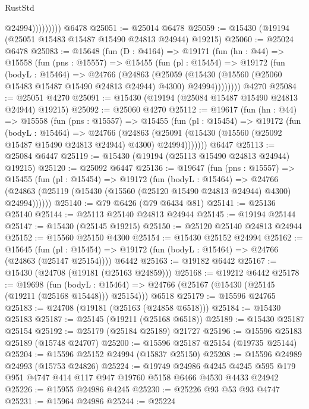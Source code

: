 \begin{lexlean}{RustStd}
\begin{coremodule}
                      @24994)))))))))
    @6478
@25051 := @25014 @6478
@25059 := @15430 (@19194 (@25051 @15483 @15487 @15490 @24813 @24944) @19215)
@25060 := @25024 @6478
@25083 := @15648
    (fun (D : @4164) =>
    @19171
      (fun (hn : @44) =>
      @15558
        (fun (pns : @15557) =>
        @15455
          (fun (pl : @15454) =>
          @19172
            (fun (bodyL : @15464) =>
            @24766
              (@24863
                (@25059
                  (@15430 (@15560 (@25060 @15483 @15487 @15490 @24813 @24944) @4300) @24994))))))))
    @4270
@25084 := @25051 @4270
@25091 := @15430 (@19194 (@25084 @15487 @15490 @24813 @24944) @19215)
@25092 := @25060 @4270
@25112 := @19617
    (fun (hn : @44) =>
    @15558
      (fun (pns : @15557) =>
      @15455
        (fun (pl : @15454) =>
        @19172
          (fun (bodyL : @15464) =>
          @24766
            (@24863
              (@25091 (@15430 (@15560 (@25092 @15487 @15490 @24813 @24944) @4300) @24994)))))))
    @6447
@25113 := @25084 @6447
@25119 := @15430 (@19194 (@25113 @15490 @24813 @24944) @19215)
@25120 := @25092 @6447
@25136 := @19647
    (fun (pns : @15557) =>
    @15455
      (fun (pl : @15454) =>
      @19172
        (fun (bodyL : @15464) =>
        @24766 (@24863 (@25119 (@15430 (@15560 (@25120 @15490 @24813 @24944) @4300) @24994))))))
@25140 := @79 @6426 (@79 @6434 @81)
@25141 := @25136 @25140
@25144 := @25113 @25140 @24813 @24944
@25145 := @19194 @25144
@25147 := @15430 (@25145 @19215)
@25150 := @25120 @25140 @24813 @24944
@25152 := @15560 @25150 @4300
@25154 := @15430 @25152 @24994
@25162 := @15645
    (fun (pl : @15454) => @19172 (fun (bodyL : @15464) => @24766 (@24863 (@25147 @25154))))
    @6442
@25163 := @19182 @6442
@25167 := @15430 (@24708 (@19181 (@25163 @24859)))
@25168 := @19212 @6442
@25178 := @19698
    (fun (bodyL : @15464) => @24766 (@25167 (@15430 (@25145 (@19211 (@25168 @15448))) @25154)))
    @6518
@25179 := @15596 @24765
@25183 := @24708 (@19181 (@25163 (@24858 @6518)))
@25184 := @15430 @25183
@25187 := @25145 (@19211 (@25168 @6518))
@25189 := @15430 @25187 @25154
@25192 := @25179 (@25184 @25189) @21727
@25196 := @15596 @25183 @25189 (@15748 @24707)
@25200 := @15596 @25187 @25154 (@19735 @25144)
@25204 := @15596 @25152 @24994 (@15837 @25150)
@25208 := @15596 @24989 @24993 (@15753 @24826)
@25224 := @19749
    @24986
    @4245
    @4245
    @595
    @179
    @951
    @4747
    @414
    @117
    @947
    @19760
    @5158
    @6466
    @4530
    @4433
    @24942
@25226 := @15955 @24986 @4245
@25230 := @25226 @93 @53 @93 @4747
@25231 := @15964 @24986
@25244 := @25224

\end{coremodule}
\end{lexlean}
